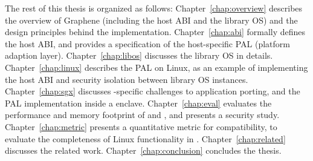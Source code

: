 
The rest of this thesis is organized as follows:
Chapter~\ref{chap:overview} describes the overview of Graphene (including the host ABI and the library OS) and the design principles behind the implementation.
Chapter~\ref{chap:abi} formally defines the host ABI, and provides a specification of the host-specific PAL (platform adaption layer).
Chapter~\ref{chap:libos} discusses the library OS in details.
Chapter~\ref{chap:linux} describes the PAL on Linux, as an example of implementing the host ABI and security isolation between library OS instances.
Chapter~\ref{chap:sgx} discusses \sgx{}-specific challenges to application porting, and the PAL implementation inside a \sgx{} enclave.
Chapter~\ref{chap:eval} evaluates the performance and memory footprint of \graphene{} and \graphenesgx{},
and presents a security study.
Chapter~\ref{chap:metric} presents a quantitative metric for compatibility,
to evaluate the completeness of Linux functionality in \graphene{}.
Chapter~\ref{chap:related} discusses the related work.
Chapter~\ref{chap:conclusion} concludes the thesis.
